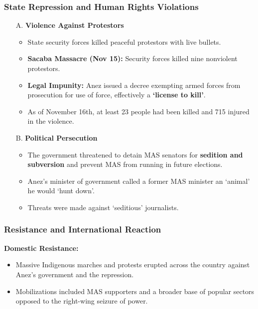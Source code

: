 \documentclass{article}
\begin{document}
    \subsubsection{State Repression and Human Rights Violations}
    \begin{itemize}
        \item [A.] \textbf{Violence Against Protestors}
        \begin{itemize}
            \item State security forces killed peaceful protestors with live
            bullets.
            \item \textbf{Sacaba Massacre (Nov 15):} Security forces killed
            nine nonviolent protestors.
            \item \textbf{Legal Impunity:} Anez issued a decree exempting
            armed forces from prosecution for use of force, effectively a \textbf{`license to kill'}.
            \item As of November 16th, at least 23 people had been killed
            and 715 injured in the violence.
        \end{itemize}
        \item[B.] \textbf{Political Persecution}
        \begin{itemize}
            \item The government threatened to detain MAS senators for \textbf{sedition and subversion} and prevent MAS from running in future elections.
            \item Anez's minister of government called a former MAS minister
            an `animal' he would `hunt down'.
            \item Threats were made against `seditious' journalists.
        \end{itemize}
    \end{itemize}

    \subsubsection{Resistance and International Reaction}

    \noindent \textbf{Domestic Resistance:}
    \begin{itemize}
        \item Massive Indigenous marches and protests erupted across the
        country against Anez's government and the repression.
        \item Mobilizations included MAS supporters and a broader base of
        popular sectors opposed to the right-wing seizure of power.
    \end{itemize}
\end{document}
